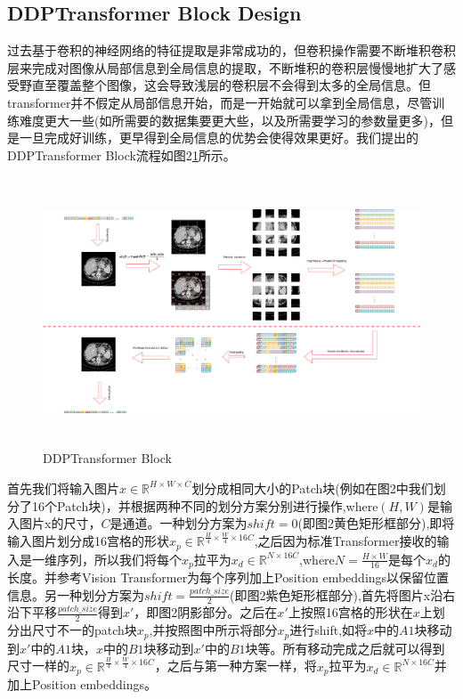 \subsection{DDPTransformer Block Design}

过去基于卷积的神经网络的特征提取是非常成功的，但卷积操作需要不断堆积卷积层来完成对图像从局部信息到全局信息的提取，不断堆积的卷积层慢慢地扩大了感受野直至覆盖整个图像，这会导致浅层的卷积层不会得到太多的全局信息。但transformer并不假定从局部信息开始，而是一开始就可以拿到全局信息，尽管训练难度更大一些(如所需要的数据集要更大些，以及所需要学习的参数量更多)，但是一旦完成好训练，更早得到全局信息的优势会使得效果更好。我们提出的DDPTransformer Block流程如图2\ref{fig2}所示。\par
\begin{figure}
	\centering
	\includegraphics[height=8cm,width=18cm]{5.eps}
	\caption{DDPTransformer Block}
	\label{fig2}
\end{figure}
首先我们将输入图片$x \in \mathbb{R}^{H\times W \times C}$划分成相同大小的Patch块(例如在图2中我们划分了16个Patch块)，并根据两种不同的划分方案分别进行操作,where$(H,W)$是输入图片x的尺寸，$C$是通道。一种划分方案为$shift=0$(即图2黄色矩形框部分),即将输入图片划分成16宫格的形状$x_p \in \mathbb{R}^{\frac{H}{4}\times \frac{W}{4} \times 16C}$,之后因为标准Transformer接收的输入是一维序列，所以我们将每个$x_p$拉平为$x_d \in \mathbb{R}^{N \times 16C}$,where$N = \frac{H\times W}{16}$是每个$x_d$的长度。并参考Vision Transformer为每个序列加上Position embeddings以保留位置信息。另一种划分方案为$shift=\frac{patch\_size}{2}$(即图2紫色矩形框部分),首先将图片x沿右沿下平移$\frac{patch\_size}{2}$得到$x'$，即图2阴影部分。之后在$x'$上按照16宫格的形状在$x$上划分出尺寸不一的patch块$x_p$,并按照图中所示将部分$x_p$进行shift,如将$x$中的$A1$块移动到$x'$中的$A1$块，$x$中的$B1$块移动到$x'$中的$B1$块等。所有移动完成之后就可以得到尺寸一样的$x_p \in \mathbb{R}^{\frac{H}{4}\times \frac{W}{4} \times 16C}$，之后与第一种方案一样，将$x_p$拉平为$x_d \in \mathbb{R}^{N \times 16C}$并加上Position embeddings。\par

